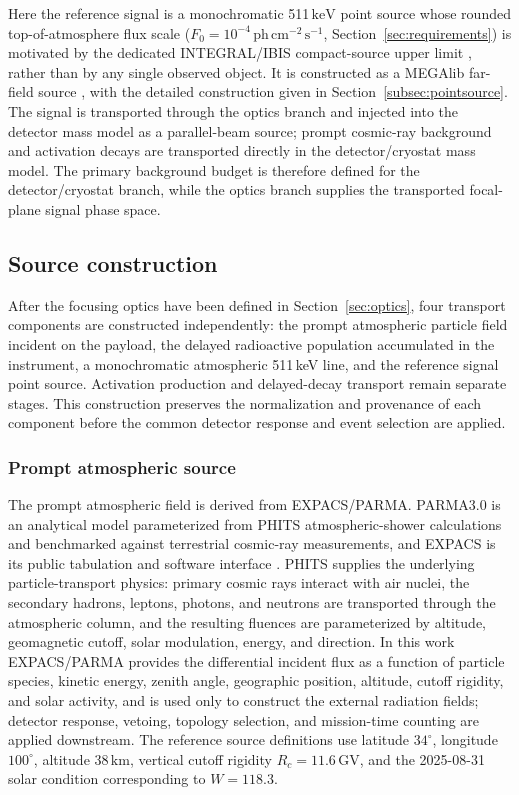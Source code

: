 \documentclass[11pt]{article}
\newcommand{\keV}{\ensuremath{\,\mathrm{keV}}}
\newcommand{\phcms}{\ensuremath{\,\mathrm{ph\,cm^{-2}\,s^{-1}}}}
\newcommand{\fzero}{F_{0}}
\begin{document}
Here the reference signal is a monochromatic 511\keV{} point source whose
rounded top-of-atmosphere flux scale
($\fzero=10^{-4}\phcms$, Section~\ref{sec:requirements}) is motivated by the
dedicated INTEGRAL/IBIS compact-source upper limit \cite{DeCesare2011}, rather
than by any single observed object. It is constructed as a MEGAlib far-field source
\cite{Zoglauer2006}, with the detailed construction given in
Section~\ref{subsec:pointsource}. The signal is transported through the optics
branch and injected into the detector mass model as a parallel-beam source;
prompt cosmic-ray background and activation decays are transported directly in
the detector/cryostat mass model. The primary background budget is therefore
defined for the detector/cryostat branch, while the optics branch supplies the
transported focal-plane signal phase space.

\subsection{Source construction}
\label{sec:background}

After the focusing optics have been defined in Section~\ref{sec:optics}, four
transport components are constructed independently: the prompt atmospheric
particle field incident on the payload, the delayed radioactive population
accumulated in the instrument, a monochromatic atmospheric 511\,keV line, and the
reference signal point source. Activation production and delayed-decay transport
remain separate stages. This construction preserves the normalization and
provenance of each component before the common detector response and event
selection are applied.

\subsubsection{Prompt atmospheric source}
\label{subsec:prompt_source}

The prompt atmospheric field is derived from EXPACS/PARMA. PARMA3.0 is an
analytical model parameterized from PHITS atmospheric-shower calculations and
benchmarked against terrestrial cosmic-ray measurements, and EXPACS is its
public tabulation and software interface
\cite{Sato2015EXPACS,Sato2016PARMA4}. PHITS supplies the underlying
particle-transport physics: primary cosmic rays interact with air nuclei, the
secondary hadrons, leptons, photons, and neutrons are transported through the
atmospheric column, and the resulting fluences are parameterized by altitude,
geomagnetic cutoff, solar modulation, energy, and direction. In this work
EXPACS/PARMA provides the differential incident flux as a function of particle
species, kinetic energy, zenith angle, geographic position, altitude, cutoff
rigidity, and solar activity, and is used only to construct the external
radiation fields; detector response, vetoing, topology selection, and
mission-time counting are applied downstream. The reference source definitions
use latitude $34^\circ$, longitude $100^\circ$, altitude $38\,\mathrm{km}$,
vertical cutoff rigidity $R_c=11.6\,\mathrm{GV}$, and the 2025-08-31 solar
condition corresponding to $W=118.3$.
\end{document}
